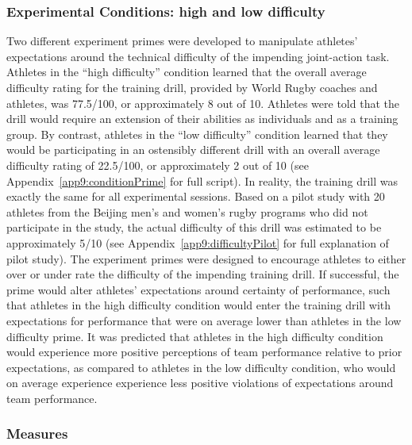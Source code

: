 \begin{CJK}{UTF8}{gbsn}
\subsubsection{Experimental Conditions: high and low difficulty\label{sect:expPrimes}}
Two different experiment primes were developed   to manipulate athletes' expectations around the technical difficulty of the impending joint-action task.  Athletes in the ``high difficulty'' condition learned that the overall average difficulty rating for the training drill, provided by World Rugby coaches and athletes, was 77.5/100, or approximately 8 out of 10.  Athletes were told that the drill would require an extension of their abilities as individuals and as a training group.  By contrast, athletes in the ``low difficulty'' condition learned that they would be participating in an ostensibly different drill with an overall average difficulty rating of 22.5/100, or approximately 2 out of 10 (see Appendix~\ref{app9:conditionPrime} for full script).  In reality, the training drill was exactly the same for all experimental sessions.  Based on a pilot study with 20 athletes from the Beijing men's and women's rugby programs who did not participate in the study, the actual difficulty of this drill was estimated to be approximately 5/10 (see Appendix~\ref{app9:difficultyPilot} for full explanation of pilot study).  The experiment primes were designed to encourage athletes to either over or under rate the difficulty of the impending training drill. If successful, the prime would alter athletes' expectations around certainty of performance, such that athletes in the high difficulty condition would enter the training drill with expectations for performance that were on average lower than athletes in the low difficulty prime. It was predicted that athletes in the high difficulty condition would experience more positive perceptions of team performance relative to prior expectations, as compared to athletes in the low difficulty condition, who would on average experience experience less positive violations of expectations around team performance.


\subsubsection{Measures}



\end{CJK}
